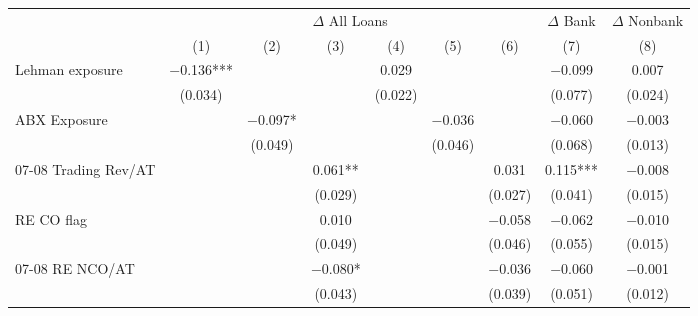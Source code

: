 {
\def\sym#1{\ifmmode^{#1}\else\(^{#1}\)\fi}
\begin{tabular}{l*{8}{c}}
\toprule\toprule
                    &\multicolumn{6}{c}{$\Delta$ All Loans}                                                         &\multicolumn{1}{c}{$\Delta$ Bank}&\multicolumn{1}{c}{$\Delta$ Nonbank}\\\cmidrule(lr){2-7}\cmidrule(lr){8-8}\cmidrule(lr){9-9}
                    &\multicolumn{1}{c}{(1)}   &\multicolumn{1}{c}{(2)}   &\multicolumn{1}{c}{(3)}   &\multicolumn{1}{c}{(4)}   &\multicolumn{1}{c}{(5)}   &\multicolumn{1}{c}{(6)}   &\multicolumn{1}{c}{(7)}   &\multicolumn{1}{c}{(8)}   \\
\toprule
Lehman exposure     &    $-$0.136***&               &               &       0.029   &               &               &    $-$0.099   &       0.007   \\
                    &     (0.034)   &               &               &     (0.022)   &               &               &     (0.077)   &     (0.024)   \\
[1em]
ABX Exposure        &               &    $-$0.097*  &               &               &    $-$0.036   &               &    $-$0.060   &    $-$0.003   \\
                    &               &     (0.049)   &               &               &     (0.046)   &               &     (0.068)   &     (0.013)   \\
[1em]
07-08 Trading Rev/AT&               &               &       0.061** &               &               &       0.031   &       0.115***&    $-$0.008   \\
                    &               &               &     (0.029)   &               &               &     (0.027)   &     (0.041)   &     (0.015)   \\
[1em]
RE CO flag          &               &               &       0.010   &               &               &    $-$0.058   &    $-$0.062   &    $-$0.010   \\
                    &               &               &     (0.049)   &               &               &     (0.046)   &     (0.055)   &     (0.015)   \\
[1em]
07-08 RE NCO/AT     &               &               &    $-$0.080*  &               &               &    $-$0.036   &    $-$0.060   &    $-$0.001   \\
                    &               &               &     (0.043)   &               &               &     (0.039)   &     (0.051)   &     (0.012)   \\

\end{tabular}}
